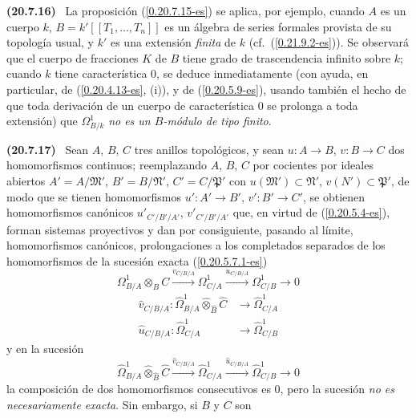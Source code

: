 \documentclass[10pt,oneside]{book}
\makeatletter
\newcommand{\sref}[1]{\textup{(\ref{#1})}}
\newcommand{\setmanualcurrentlabel}[1]{\def\@currentlabel{#1}}
\newenvironment{env}[1][]{\setmanualcurrentlabel{#1}\par\medskip\noindent\textbf{(#1)}\ }{\par}
\makeatother
\begin{document}
\begin{env}[20.7.16]
\label{0.20.7.16-es}
La proposición \sref{0.20.7.15-es} se aplica, por ejemplo, cuando $A$ es un
cuerpo $k$, $B=k'[[T_1,\ldots,T_n]]$ es un álgebra de series formales provista de
su topología usual, y $k'$ es una extensión \emph{finita} de $k$ (cf.\
\sref{0.21.9.2-es}). Se observará que el cuerpo de fracciones $K$ de $B$ tiene
grado de trascendencia infinito sobre $k$; cuando $k$ tiene característica
$0$, se deduce inmediatamente (con ayuda, en particular, de
(\ref{0.20.4.13-es}, (i)), y de \sref{0.20.5.9-es}, usando también el hecho de
que toda derivación de un cuerpo de característica $0$ se prolonga a toda
extensión) que $\Omega^1_{B/k}$ \emph{no es un $B$-módulo de tipo finito}.
\end{env}

\begin{env}[20.7.17]
\label{0.20.7.17-es}
Sean $A$, $B$, $C$ tres anillos topológicos, y sean $u:A\to B$, $v:B\to C$
dos homomorfismos continuos; reemplazando $A$, $B$, $C$ por cocientes por
ideales abiertos $A'=A/\mathfrak{M}'$, $B'=B/\mathfrak{N}'$,
$C'=C/\mathfrak P'$ con $u(\mathfrak{M}')\subset\mathfrak{N}'$,
$v(N')\subset\mathfrak{P}'$, de modo que se tienen homomorfismos
$u':A'\to B'$, $v':B'\to C'$, se obtienen homomorfismos canónicos
$u'_{C'/B'/A'}$, $v'_{C'/B'/A'}$ que, en virtud de
\sref{0.20.5.4-es}, forman sistemas proyectivos y dan por consiguiente,
pasando al límite, homomorfismos canónicos, prolongaciones a los completados
separados de los homomorfismos de la sucesión exacta
\sref{0.20.5.7.1-es}
\[
  \Omega^1_{B/A}\otimes_B C\xrightarrow{v_{C/B/A}}\Omega^1_{C/A}
  \xrightarrow{u_{C/B/A}}\Omega^1_{C/B}\to0
\]
\begin{align}
  \widehat v_{C/B/A}:\widehat{\Omega}^1_{B/A}
  \widehat\otimes_{\widehat B}\widehat C&\to\widehat{\Omega}^1_{C/A}
  \tag{20.7.17.1}\label{0.20.7.17.1-es}\\
  \widehat u_{C/B/A}:\widehat{\Omega}^1_{C/A}&\to
  \widehat{\Omega}^1_{C/B} \tag{20.7.17.2}\label{0.20.7.17.2-es}
\end{align}
y en la sucesión
\begin{equation}
\tag{20.7.17.3}
\label{0.20.7.17.3-es}
  \widehat{\Omega}^1_{B/A}\widehat\otimes_{\widehat B}\widehat C
  \xrightarrow{\widehat v_{C/B/A}}\widehat{\Omega}^1_{C/A}
  \xrightarrow{\widehat u_{C/B/A}}\widehat{\Omega}^1_{C/B}\to0
\end{equation}
la composición de dos homomorfismos consecutivos es $0$, pero la sucesión
\emph{no es necesariamente exacta}. Sin embargo, si $B$ y $C$ son

\end{env}
\end{document}
